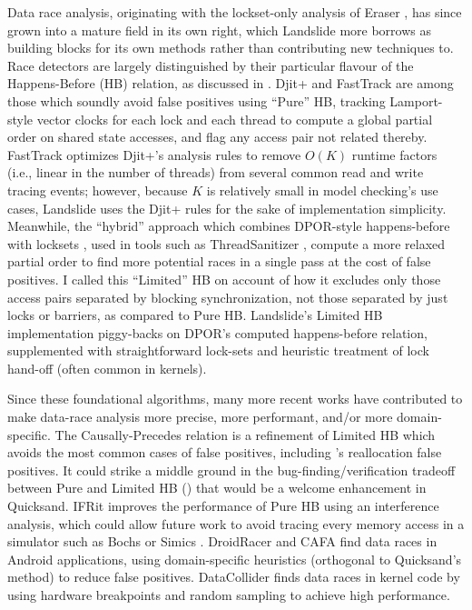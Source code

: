 Data race analysis, originating with the lockset-only analysis of Eraser \cite{eraser},
has since grown into a mature field in its own right,
which Landslide more borrows as building blocks for its own methods rather than contributing new techniques to.
Race detectors are largely distinguished by their particular flavour of the Happens-Before (HB) relation,
as discussed in \sect{\ref{sec:background-hb}}.
Djit+ \cite{djit} and FastTrack \cite{fasttrack} are among those
which soundly avoid false positives using ``Pure'' HB,
tracking Lamport-style vector clocks \cite{lamport-clocks}
for each lock and each thread to compute a global partial order on shared state accesses,
and flag any access pair not related thereby.
FastTrack optimizes Djit+'s analysis rules to remove $O(K)$ runtime factors (i.e., linear in the number of threads)
from several common read and write tracing events;
however, because $K$ is relatively small in model checking's use cases,
Landslide uses the Djit+ rules for the sake of implementation simplicity.
Meanwhile, the ``hybrid'' approach which combines DPOR-style happens-before with locksets \cite{hybriddatarace},
used in tools such as ThreadSanitizer \cite{tsan},
compute a more relaxed partial order to find more potential races in a single pass at the cost of false positives.
I called this ``Limited'' HB on account of how it excludes only those access pairs separated by blocking synchronization,
not those separated by just locks or barriers,
as compared to Pure HB.
Landslide's Limited HB implementation piggy-backs on DPOR's computed happens-before relation,
supplemented with straightforward lock-sets and heuristic treatment of lock hand-off
(often common in kernels).

Since these foundational algorithms,
many more recent works have contributed to make data-race analysis more precise, more performant,
and/or more domain-specific.
The Causally-Precedes relation \cite{predictive-dr} is a refinement of Limited HB which avoids the most common cases of false positives,
including \sect{\ref{sec:quicksand-soundness}}'s reallocation false positives.
It could strike a middle ground in the bug-finding/verification tradeoff
between Pure and Limited HB (\sect{\ref{sec:quicksand-eval}})
that would be a welcome enhancement in Quicksand.
IFRit \cite{ifrit}
improves the performance of Pure HB using an interference analysis,
which could allow future work to avoid tracing every memory access in a simulator such as Bochs \cite{bochs} or Simics \cite{simics}.
%
DroidRacer \cite{droidracer} and CAFA \cite{cafa} find data races in Android applications,
using domain-specific heuristics (orthogonal to Quicksand's method) to reduce false positives.
DataCollider \cite{datacollider} finds data races in kernel code
by using hardware breakpoints and random sampling to achieve high performance.

